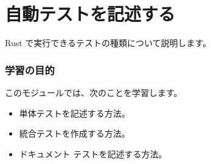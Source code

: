\section{自動テストを記述する}

Rust で実行できるテストの種類について説明します。

\subsubsection{学習の目的}

このモジュールでは、次のことを学習します。

\begin{itemize}
\item 単体テストを記述する方法。
\item 統合テストを作成する方法。
\item ドキュメント テストを記述する方法。
\end{itemize}

